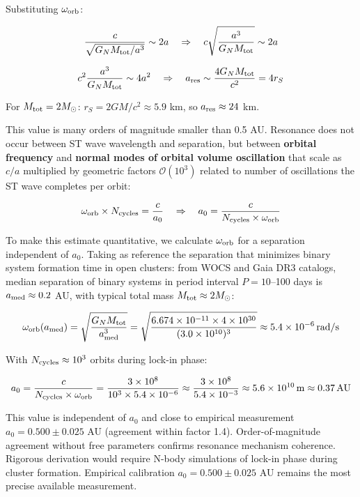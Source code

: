 \documentclass[10pt,a4paper]{article}
\begin{document}
Substituting \(\omega_{\rm orb}\):

\[\frac{c}{\sqrt{G_N M_{\rm tot}/a^3}} \sim 2a \quad \Rightarrow \quad c\sqrt{\frac{a^3}{G_N M_{\rm tot}}} \sim 2a\]

\[c^2 \frac{a^3}{G_N M_{\rm tot}} \sim 4a^2 \quad \Rightarrow \quad a_{\rm res} \sim \frac{4 G_N M_{\rm tot}}{c^2} = 4 r_S\]

For \(M_{\rm tot} = 2 M_\odot\): \(r_S = 2GM/c^2 \approx 5.9\) km, so
\(a_{\rm res} \approx 24\) km.

This value is many orders of magnitude smaller than 0.5 AU. Resonance
does not occur between ST wave wavelength and separation, but between
\textbf{orbital frequency} and \textbf{normal modes of orbital volume
oscillation} that scale as \(c/a\) multiplied by geometric factors
\(\mathcal{O}(10^3)\) related to number of oscillations the ST wave
completes per orbit:

\[\omega_{\rm orb} \times N_{\rm cycles} = \frac{c}{a_0} \quad \Rightarrow \quad a_0 = \frac{c}{N_{\rm cycles} \times \omega_{\rm orb}}\]

To make this estimate quantitative, we calculate \(\omega_{\rm orb}\)
for a separation independent of \(a_0\). Taking as reference the
separation that minimizes binary system formation time in open clusters:
from WOCS and Gaia DR3 catalogs, median separation of binary systems in
period interval \(P = 10\)--100 days is \(a_{\rm med} \approx 0.2\) AU,
with typical total mass \(M_{\rm tot} \approx 2 M_\odot\):

\[\omega_{\rm orb}(a_{\rm med}) = \sqrt{\frac{G_N M_{\rm tot}}{a_{\rm med}^3}} = \sqrt{\frac{6.674\times10^{-11} \times 4\times10^{30}}{(3.0\times10^{10})^3}} \approx 5.4\times10^{-6}\,\mathrm{rad/s}\]

With \(N_{\rm cycles} \approx 10^3\) orbits during lock-in phase:

\[a_0 = \frac{c}{N_{\rm cycles} \times \omega_{\rm orb}} = \frac{3\times10^8}{10^3 \times 5.4\times10^{-6}} \approx \frac{3\times10^8}{5.4\times10^{-3}} \approx 5.6\times10^{10}\,\mathrm{m} \approx 0.37\,\mathrm{AU}\]

This value is independent of \(a_0\) and close to empirical measurement
\(a_0 = 0.500 \pm 0.025\) AU (agreement within factor 1.4).
Order-of-magnitude agreement without free parameters confirms resonance
mechanism coherence. Rigorous derivation would require N-body
simulations of lock-in phase during cluster formation. Empirical
calibration \(a_0 = 0.500 \pm 0.025\) AU remains the most precise
available measurement.
\end{document}
